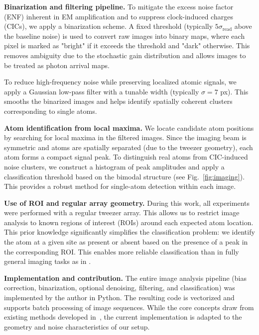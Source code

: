 \textbf{Binarization and filtering pipeline.}  
To mitigate the excess noise factor (ENF) inherent in EM amplification and to suppress clock-induced charges (CICs), we apply a binarization scheme. A fixed threshold (typically $5\sigma_\text{read}$ above the baseline noise) is used to convert raw images into binary maps, where each pixel is marked as "bright" if it exceeds the threshold and "dark" otherwise. This removes ambiguity due to the stochastic gain distribution and allows images to be treated as photon arrival maps.  

To reduce high-frequency noise while preserving localized atomic signals, we apply a Gaussian low-pass filter with a tunable width (typically $\sigma = 7$ px). This smooths the binarized images and helps identify spatially coherent clusters corresponding to single atoms. 

\textbf{Atom identification from local maxima.}  
We locate candidate atom positions by searching for local maxima in the filtered images. Since the imaging beam is symmetric and atoms are spatially separated (due to the tweezer geometry), each atom forms a compact signal peak. To distinguish real atoms from CIC-induced noise clusters, we construct a histogram of peak amplitudes and apply a classification threshold based on the bimodal structure (see Fig.~\ref{fig:imaging}). This provides a robust method for single-atom detection within each image.

\textbf{Use of ROI and regular array geometry.}  
During this work, all experiments were performed with a regular tweezer array. This allows us to restrict image analysis to known regions of interest (ROIs) around each expected atom location. This prior knowledge significantly simplifies the classification problem: we identify the atom at a given site as present or absent based on the presence of a peak in the corresponding ROI. This enables more reliable classification than in fully general imaging tasks as in \cite{bergschneider_spin-resolved_2018}.

\textbf{Implementation and contribution.}  
The entire image analysis pipeline (bias correction, binarization, optional denoising, filtering, and classification) was implemented by the author in Python. The resulting code is vectorized and supports batch processing of image sequences. While the core concepts draw from existing methods developed in~\cite{bergschneider_spin-resolved_2018}, the current implementation is adapted to the geometry and noise characteristics of our setup. 


